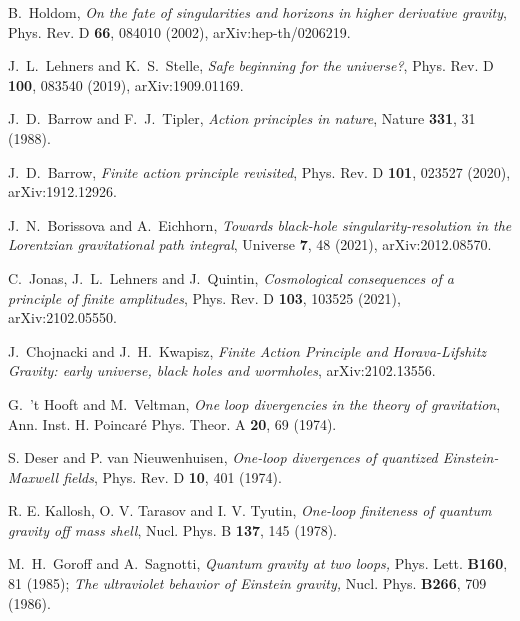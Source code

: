 \documentclass[aps,prd,a4paper,twocolumn,showpacs,showkeys,preprintnumbers,amsmath,amssymb,nofootinbib,usenames,dvipsnames]{revtex4-2}
\begin{document}
\begin{thebibliography}{99}
B.~Holdom,
{\it On the fate of singularities and horizons in higher derivative gravity},
Phys. Rev. D \textbf{66}, 084010 (2002),
arXiv:hep-th/0206219.

J.~L.~Lehners and K.~S.~Stelle,
{\it Safe beginning for the universe?},
Phys. Rev. D \textbf{100}, 083540 (2019),
arXiv:1909.01169.

J.~D.~Barrow and F.~J.~Tipler,
{\it Action principles in nature},
Nature \textbf{331}, 31 (1988).

J.~D.~Barrow,
{\it Finite action principle revisited},
Phys. Rev. D \textbf{101}, 023527 (2020),
arXiv:1912.12926.

J.~N.~Borissova and A.~Eichhorn,
{\it Towards black-hole singularity-resolution in the Lorentzian gravitational path integral},
Universe \textbf{7}, 48 (2021),
arXiv:2012.08570.

C.~Jonas, J.~L.~Lehners and J.~Quintin,
{\it Cosmological consequences of a principle of finite amplitudes},
Phys. Rev. D \textbf{103}, 103525 (2021),
arXiv:2102.05550.

J.~Chojnacki and J.~H.~Kwapisz,
{\it Finite Action Principle and Horava-Lifshitz Gravity: early universe, black holes and wormholes},
arXiv:2102.13556.


G.~'t Hooft and M.~Veltman,
{\it One loop divergencies in the theory of gravitation},
Ann. Inst. H. Poincar\'e Phys. Theor. A \textbf{20}, 69 (1974).

 S. Deser and P. van Nieuwenhuisen,
{ \it One-loop divergences of quantized Einstein-Maxwell fields},
Phys. Rev. D {\bf10}, 401 (1974). %

 R. E. Kallosh, O. V. Tarasov and I. V. Tyutin,
{\it One-loop finiteness of quantum gravity off mass shell},
Nucl. Phys. B {\bf 137}, 145  (1978). %

 M.~H.~Goroff and A.~Sagnotti,
{\it Quantum gravity at two loops,}
Phys. Lett. {\bf B160}, 81 (1985);
{\it The ultraviolet behavior of Einstein gravity,}
Nucl. Phys. {\bf B266}, 709 (1986).


\end{thebibliography}
\end{document}

